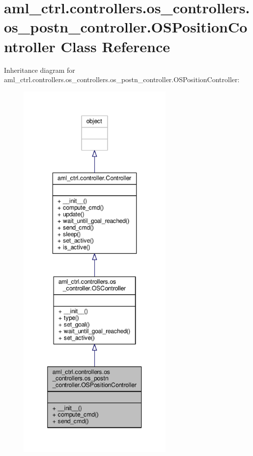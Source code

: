 \hypertarget{classaml__ctrl_1_1controllers_1_1os__controllers_1_1os__postn__controller_1_1_o_s_position_controller}{\section{aml\-\_\-ctrl.\-controllers.\-os\-\_\-controllers.\-os\-\_\-postn\-\_\-controller.\-O\-S\-Position\-Controller Class Reference}
\label{classaml__ctrl_1_1controllers_1_1os__controllers_1_1os__postn__controller_1_1_o_s_position_controller}
}


Inheritance diagram for aml\-\_\-ctrl.\-controllers.\-os\-\_\-controllers.\-os\-\_\-postn\-\_\-controller.\-O\-S\-Position\-Controller\-:
\nopagebreak
\begin{figure}[H]
\begin{center}
\leavevmode
\includegraphics[height=550pt]{classaml__ctrl_1_1controllers_1_1os__controllers_1_1os__postn__controller_1_1_o_s_position_controller__inherit__graph}
\end{center}
\end{figure}


